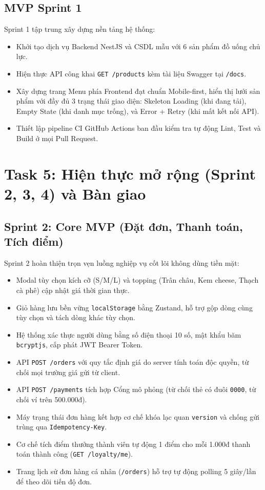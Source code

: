 \documentclass[12pt, a4paper]{article}
\begin{document}
\subsection{MVP Sprint 1}
Sprint 1 tập trung xây dựng nền tảng hệ thống:
\begin{itemize}
  \item Khởi tạo dịch vụ Backend NestJS và CSDL mẫu với 6 sản phẩm đồ uống chủ lực.
  \item Hiện thực API công khai \texttt{GET /products} kèm tài liệu Swagger tại \texttt{/docs}.
  \item Xây dựng trang Menu phía Frontend đạt chuẩn Mobile-first, hiển thị lưới sản phẩm với đầy đủ 3 trạng thái giao diện:
        Skeleton Loading (khi đang tải), Empty State (khi danh mục trống), và Error + Retry (khi mất kết nối API).
  \item Thiết lập pipeline CI GitHub Actions ban đầu kiểm tra tự động Lint, Test và Build ở mọi Pull Request.
\end{itemize}

\section{Task 5: Hiện thực mở rộng (Sprint 2, 3, 4) và Bàn giao}
\subsection{Sprint 2: Core MVP (Đặt đơn, Thanh toán, Tích điểm)}
Sprint 2 hoàn thiện trọn vẹn luồng nghiệp vụ cốt lõi không dùng tiền mặt:
\begin{itemize}
  \item Modal tùy chọn kích cỡ (S/M/L) và topping (Trân châu, Kem cheese, Thạch cà phê) cập nhật giá thời gian thực.
  \item Giỏ hàng lưu bền vững \texttt{localStorage} bằng Zustand, hỗ trợ gộp dòng cùng tùy chọn và tách dòng khác tùy chọn.
  \item Hệ thống xác thực người dùng bằng số điện thoại 10 số, mật khẩu băm \texttt{bcryptjs}, cấp phát JWT Bearer Token.
  \item API \texttt{POST /orders} với quy tắc định giá do server tính toán độc quyền, từ chối mọi trường giá gửi từ client.
  \item API \texttt{POST /payments} tích hợp Cổng mô phỏng (từ chối thẻ có đuôi \texttt{0000}, từ chối ví trên 500.000đ).
  \item Máy trạng thái đơn hàng kết hợp cơ chế khóa lạc quan \texttt{version} và chống gửi trùng qua \texttt{Idempotency-Key}.
  \item Cơ chế tích điểm thưởng thành viên tự động 1 điểm cho mỗi 1.000đ thanh toán thành công (\texttt{GET /loyalty/me}).
  \item Trang lịch sử đơn hàng cá nhân (\texttt{/orders}) hỗ trợ tự động polling 5 giây/lần để theo dõi tiến độ đơn.
\end{itemize}
\end{document}
